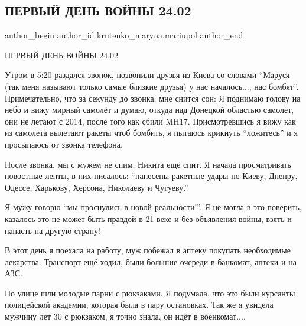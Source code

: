  
 
 
 
 

\subsection{ПЕРВЫЙ ДЕНЬ ВОЙНЫ 24.02}
\label{sec:24_02_2023.fb.krutenko_maryna.mariupol.1.pervii_den_voini_24_}

\ifcmt
 author_begin
   author_id krutenko_maryna.mariupol
 author_end
\fi

ПЕРВЫЙ ДЕНЬ ВОЙНЫ 24.02

Утром в 5:20 раздался звонок, позвонили друзья из Киева со словами \enquote{Маруся (так
меня называют только самые близкие друзья) у нас началось..., нас бомбят}.
Примечательно, что за секунду до звонка, мне снится сон: Я поднимаю голову на
небо и вижу мирный самолёт и думаю, откуда над Донецкой областью самолёт, они
не летают с 2014, после того как сбили MH17. Присмотревшись я вижу как из
самолета вылетают ракеты чтоб бомбить, я пытаюсь крикнуть \enquote{ложитесь} и я
просыпаюсь от звонка телефона. 

После звонка, мы с мужем не спим, Никита ещё спит. Я начала просматривать
новостные ленты, в них писалось: \enquote{нанесены ракетные удары по Киеву, Днепру,
Одессе, Харькову, Херсона, Николаеву и Чугуеву.} 

Я мужу говорю \enquote{мы проснулись в новой реальности!}. Я не могла в это поверить,
казалось это не может быть правдой в 21 веке и без объявления войны, взять и
напасть на другую страну!

В этот день я поехала на работу, муж побежал в аптеку покупать необходимые
лекарства. Транспорт ещё ходил, были большие очереди в банкомат, аптеки и на
АЗС. 

По улице шли молодые парни с рюкзаками. Я подумала, что это были курсанты
полицейской академии, которая была в пару остановках. Так же я увидела мужчину
лет 30 с рюкзаком, я точно знала, он идёт в военкомат....

